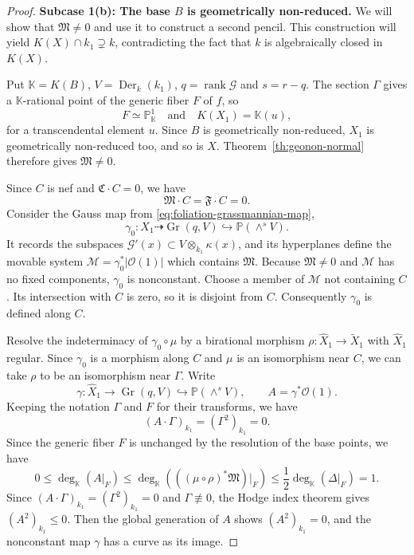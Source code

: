 \documentclass[10pt,abstract=true]{scrartcl}
\numberwithin{equation}{section}
\theoremstyle{definition}
\theoremstyle{remark}
\begin{document}
\begin{proof}
  \par\smallskip
  \noindent\textbf{Subcase 1(b): The base $B$ is geometrically non-reduced.}
  We will show that $\mathfrak M\ne0$ and use it to construct a second pencil.
  This construction will yield $K(X)\cap k_1\supsetneq k$, contradicting the fact that $k$ is algebraically closed in $K(X)$.

  Put $\mathbb K=K(B)$, $V=\operatorname{Der}_k(k_1)$, $q = \operatorname{rank} \mathscr G$ and $s = r-q$.
  The section $\Gamma$ gives a $\mathbb K$-rational point of the generic fiber $F$ of $f$, so
  \[
    F\simeq\mathbb P^1_{\mathbb K}\quad \text{and} \quad K(X_1)=\mathbb K(u), 
  \]
  for a transcendental element $u$.
  Since $B$ is geometrically non-reduced, $X_1$ is geometrically non-reduced too, and so is $X$.
  Theorem~\ref{th:geonon-normal} therefore gives $\mathfrak M\ne0$.

  Since $C$ is nef and $\mathfrak C\cdot C = 0$, we have
  \[
    \mathfrak M\cdot C = \mathfrak F\cdot C = 0 .
  \]
  Consider the Gauss map from \eqref{eq:foliation-grassmannian-map},
  \[
    \gamma_0\colon X_1\dashrightarrow\operatorname{Gr}(q,V)\hookrightarrow\mathbb P(\wedge^s V).
  \]
  It records the subspaces $\mathscr G'(x) \subset V \otimes_{k_1} \kappa(x)$, and its hyperplanes define the movable system $\mathcal M = \gamma_0^*|\mathcal O(1)|$ which contains $\mathfrak M$.
  Because $\mathfrak M\ne0$ and $\mathcal M$ has no fixed components, $\gamma_0$ is nonconstant.
  Choose a member of $\mathcal M$ not containing $C$.
  Its intersection with $C$ is zero, so it is disjoint from $C$.
  Consequently $\gamma_0$ is defined along $C$.

  Resolve the indeterminacy of $\gamma_0\circ\mu$ by a birational morphism $\rho\colon\widehat X_1\to\widetilde X_1$ with $\widehat X_1$ regular.
  Since $\gamma_0$ is a morphism along $C$ and $\mu$ is an isomorphism near $C$, we can take $\rho$ to be an isomorphism near $\Gamma$.
  Write
  \[
    \gamma\colon\widehat X_1\longrightarrow\operatorname{Gr}(q,V)\hookrightarrow\mathbb P(\wedge^s V),
    \qquad A=\gamma^*\mathcal O(1).
  \]
  Keeping the notation $\Gamma$ and $F$ for their transforms, we have
  \[
    (A\cdot\Gamma)_{k_1}=(\Gamma^2)_{k_1}=0.
  \]
   Since the generic fiber $F$ is unchanged by the resolution of the base points, we have \[
     0\leq\deg_{\mathbb K}(A|_F) \le \deg_{\mathbb K}(((\mu\circ\rho)^*\mathfrak M)|_F) \le \frac12 \deg_{\mathbb K} (\Delta|_{F})=1.
  \]
  Since $(A\cdot\Gamma)_{k_1}=(\Gamma^2)_{k_1}=0$ and $\Gamma\not\equiv0$, the Hodge index theorem gives $(A^2)_{k_1}\leq0$. 
  Then the global generation of $A$ shows $(A^2)_{k_1}=0$, and the nonconstant map $\gamma$ has a curve as its image.


\end{proof}
\end{document}
